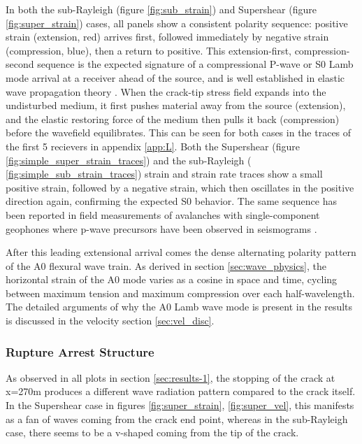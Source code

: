 In both the sub-Rayleigh (figure \ref{fig:sub_strain}) and Supershear
(figure \ref{fig:super_strain}) cases, all panels show a consistent polarity sequence: positive strain (extension, red) arrives first, followed immediately by negative strain (compression, blue), then a return to positive. This extension-first, compression-second sequence is the expected signature of a compressional P-wave or S0 Lamb mode arrival at a receiver ahead of the source, and is well established in elastic wave propagation theory \parencite{kAkiRichards19801981}. When the crack-tip stress field expands into the undisturbed medium, it first pushes material away from the source (extension), and the elastic restoring force of the medium then pulls it back (compression) before the wavefield equilibrates. This can be seen for both cases in the traces of the first 5 recievers in appendix \ref{app:L}. Both the Supershear (figure \ref{fig:simple_super_strain_traces}) and the sub-Rayleigh ( \ref{fig:simple_sub_strain_traces}) strain and strain rate traces show a small positive strain, followed by a negative strain, which then oscillates in the positive direction again, confirming the expected S0 behavior. The same sequence has been reported in field measurements of avalanches with single-component geophones where p-wave precursors have been observed in seismograms
\parencite{herwijnenSeismicSensorArray2011}. \par

After this leading extensional arrival comes the dense alternating polarity pattern of the A0 flexural wave train. As derived in section \ref{sec:wave_physics}, the horizontal strain of the A0 mode varies as a cosine in space and time, cycling between maximum tension and maximum compression over each half-wavelength. The detailed arguments of why the A0 Lamb wave mode is present in the results is discussed in the velocity section \ref{sec:vel_disc}. \par

\subsubsection{Rupture Arrest Structure}
As observed in all plots in section \ref{sec:results-1}, the stopping of the crack at x=270m produces a different wave radiation pattern compared to the crack itself. In the Supershear case in figures \ref{fig:super_strain}, \ref{fig:super_vel}, this manifests as a fan of waves coming from the crack end point, whereas in the sub-Rayleigh case, there seems to be a v-shaped coming from the tip of the crack. \par

